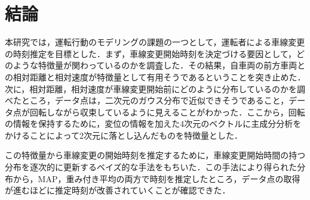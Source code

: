 \chapter{結論}
本研究では，運転行動のモデリングの課題の一つとして，運転者による車線変更の時刻推定を目標とした．まず，車線変更開始時刻を決定づける要因として，どのような特徴量が関わっているのかを調査した．その結果，自車両の前方車両との相対距離と相対速度が特徴量として有用そうであるということを突き止めた．次に，相対距離，相対速度が車線変更開始前にどのように分布しているのかを調べたところ，データ点は，二次元のガウス分布で近似できそうであること，データ点が回転しながら収束しているように見えることがわかった．ここから，回転の情報を保持するために，変位の情報を加えた4次元のベクトルに主成分分析をかけることによって2次元に落とし込んだものを特徴量とした．
\par
この特徴量から車線変更の開始時刻を推定するために，車線変更開始時間の持つ分布を逐次的に更新するベイズ的な手法をもちいた．この手法により得られた分布から，MAP，重み付き平均の両方で時刻を推定したところ，データ点の取得が進むほどに推定時刻が改善されていくことが確認できた．
